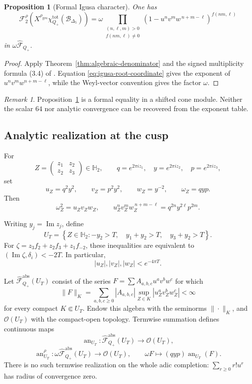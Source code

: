\documentclass[11pt,reqno]{amsart}
\newtheorem{proposition}[theorem]{Proposition}
\theoremstyle{definition}
\theoremstyle{remark}
\newtheorem{remark}[theorem]{Remark}
\begin{document}
\begin{proposition}[Formal Igusa character]
\label{prop:formal-igusa-character}
One has
\[
 \mathcal F_2^\rho\!\left(
 X^{\rho_{\mathrm{geo}}}
 \chi_{Q_+}^{\mathrm{tot}}(\mathcal B_{\Delta_5})\right)
 =
 \omega\prod_{\substack{(n,\ell,m)>0\\ f(nm,\ell)\ne0}}
 \left(1-u^nv^mw^{\,n+m-\ell}\right)^{f(nm,\ell)}
\]
in \(\omega\widehat{\mathscr F}_{Q_+}\).
\end{proposition}

\begin{proof}
Apply Theorem~\ref{thm:algebraic-denominator} and the signed
multiplicity formula (3.4) of \cite{GN97}.  Equation
\eqref{eq:igusa-root-coordinate} gives the exponent of
\(u^nv^mw^{n+m-\ell}\), while the Weyl-vector convention gives the
factor \(\omega\).
\end{proof}

\begin{remark}
Proposition~\ref{prop:formal-igusa-character} is a formal equality in a
shifted cone module.  Neither the scalar \(64\) nor analytic convergence
can be recovered from the exponent table.
\end{remark}

\subsection{Analytic realization at the cusp}

For
\[
 Z=\begin{pmatrix}z_1&z_2\\z_2&z_3\end{pmatrix}\in\mathbb H_2,
 \qquad
 q=e^{2\pi iz_1},\quad y=e^{2\pi iz_2},\quad
 p=e^{2\pi iz_3},
\]
set
\[
 u_Z=q^2y^2,\qquad v_Z=p^2y^2,\qquad
 w_Z=y^{-2},\qquad \omega_Z=qyp.
\]
Then
\[
 \omega_Z^2=u_Zv_Zw_Z,\qquad
 u_Z^nv_Z^mw_Z^{\,n+m-\ell}
 =q^{2n}y^{2\ell}p^{2m}.
\]

Writing \(y_j=\operatorname{Im}z_j\), define
\[
 U_T=\left\{Z\in\mathbb H_2:
 -y_2>T,\quad y_1+y_2>T,\quad y_3+y_2>T\right\}.
\]
For
\(\zeta=z_3f_2+z_2f_3+z_1f_{-2}\), these inequalities are equivalent to
\((\operatorname{Im}\zeta,\delta_i)<-2T\).  In particular,
\[
 |u_Z|,|v_Z|,|w_Z|<e^{-4\pi T}.
\]

Let
\(\widehat{\mathscr F}_{Q_+}^{\mathrm{abs}}(U_T)\) consist of the
series \(F=\sum A_{a,b,c}u^av^bw^c\) for which
\[
 \|F\|_K
 =\sum_{a,b,c\ge0}|A_{a,b,c}|
 \sup_{Z\in K}|u_Z^av_Z^bw_Z^c|<\infty
\]
for every compact \(K\Subset U_T\).  Endow this algebra with the
seminorms \(\|\cdot\|_K\), and \(\mathcal O(U_T)\) with the
compact-open topology.  Termwise summation defines continuous maps
\[
 \operatorname{an}_{U_T}:
 \widehat{\mathscr F}_{Q_+}^{\mathrm{abs}}(U_T)
 \longrightarrow\mathcal O(U_T),
\]
\[
 \operatorname{an}_{U_T}^{\rho}:
 \omega\widehat{\mathscr F}_{Q_+}^{\mathrm{abs}}(U_T)
 \longrightarrow\mathcal O(U_T),\qquad
 \omega F\longmapsto(qyp)\operatorname{an}_{U_T}(F).
\]
There is no such termwise realization on the whole adic completion:
\(\sum_{r\ge0}r!u^r\) has radius of convergence zero.
\end{document}
